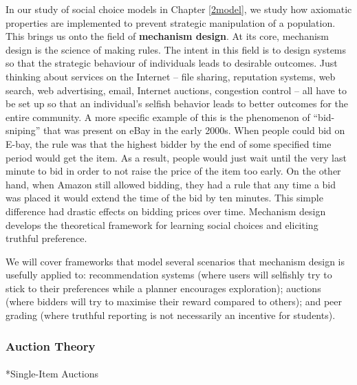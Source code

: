 \documentclass[
  letterpaper,
  numbers=noenddot,
  DIV=11]{scrreprt}
\makeatletter
\let\oldparagraph\paragraph
\renewcommand{\paragraph}{
    \@ifstar
      \xxxParagraphStar
      \xxxParagraphNoStar
  }
\newcommand{\xxxParagraphStar}[1]{\oldparagraph*{#1}\mbox{}}
\newcommand{\xxxParagraphNoStar}[1]{\oldparagraph{#1}\mbox{}}
\theoremstyle{plain}
\theoremstyle{definition}
\theoremstyle{plain}
\theoremstyle{remark}
\makeatother
\begin{document}
In our study of social choice models in Chapter
\hyperref[2human-decision-making-choice-models]{{[}2model{]}}, we study
how axiomatic properties are implemented to prevent strategic
manipulation of a population. This brings us onto the field of
\textbf{mechanism design}. At its core, mechanism design is the science
of making rules. The intent in this field is to design systems so that
the strategic behaviour of individuals leads to desirable outcomes. Just
thinking about services on the Internet -- file sharing, reputation
systems, web search, web advertising, email, Internet auctions,
congestion control -- all have to be set up so that an individual's
selfish behavior leads to better outcomes for the entire community. A
more specific example of this is the phenomenon of ``bid-sniping'' that
was present on eBay in the early 2000s. When people could bid on E-bay,
the rule was that the highest bidder by the end of some specified time
period would get the item. As a result, people would just wait until the
very last minute to bid in order to not raise the price of the item too
early. On the other hand, when Amazon still allowed bidding, they had a
rule that any time a bid was placed it would extend the time of the bid
by ten minutes. This simple difference had drastic effects on bidding
prices over time. Mechanism design develops the theoretical framework
for learning social choices and eliciting truthful preference.

We will cover frameworks that model several scenarios that mechanism
design is usefully applied to: recommendation systems (where users will
selfishly try to stick to their preferences while a planner encourages
exploration); auctions (where bidders will try to maximise their reward
compared to others); and peer grading (where truthful reporting is not
necessarily an incentive for students).

\subsubsection*{Auction Theory}\label{auction-theory}

\paragraph*{Single-Item Auctions}\label{single-item-auctions}
\end{document}

